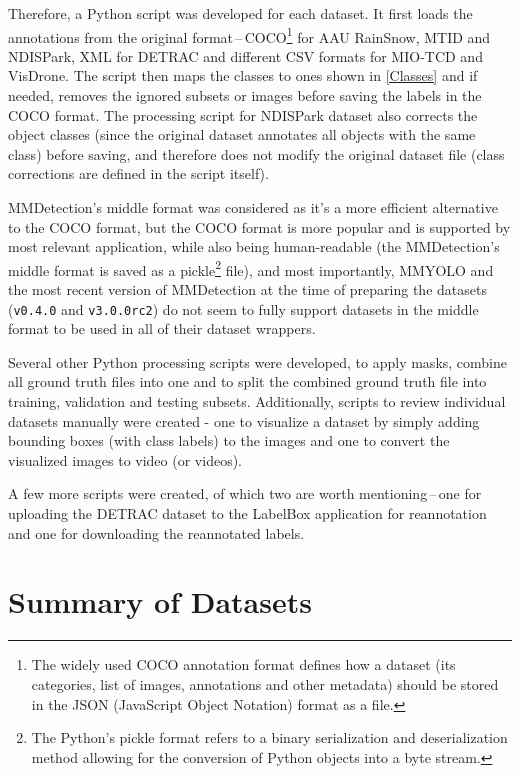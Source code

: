 Therefore, a Python script was developed for each dataset. It first loads the
annotations from the original format\,--\,COCO\footnote{The widely used COCO
annotation format defines how a dataset (its categories, list of images,
annotations and other metadata) should be stored in the JSON (JavaScript Object
Notation) format as a file.} for AAU RainSnow, MTID
and NDISPark, XML for DETRAC and different CSV formats for MIO-TCD and VisDrone.
The script then maps the classes to ones shown in \autoref{Classes} and if
needed, removes the ignored subsets or images before saving the labels in the
COCO format. The processing script for NDISPark dataset also corrects the object
classes (since the original dataset annotates all objects with the same class)
before saving, and therefore does not modify the original dataset file (class
corrections are defined in the script itself).

MMDetection's middle format was considered as it's a more efficient alternative
to the COCO format, but the COCO format is more popular and is supported by most
relevant application, while also being human-readable (the MMDetection's middle
format is saved as a pickle\footnote{The Python's pickle format refers to a
binary serialization and deserialization method allowing for the conversion of
Python objects into a byte stream.} file), and most importantly, MMYOLO and the
most recent version of MMDetection at the time of preparing the datasets
(\texttt{v0.4.0} and \texttt{v3.0.0rc2}) do not seem to fully support datasets
in the middle format to be used in all of their dataset wrappers.

Several other Python processing scripts were developed, to apply masks, combine
all ground truth files into one and to split the combined ground truth file into
training, validation and testing subsets. Additionally, scripts to review
individual datasets manually were created - one to visualize a dataset by simply
adding bounding boxes (with class labels) to the images and one to convert the
visualized images to video (or videos).

A few more scripts were created, of which two are worth mentioning\,--\,one for
uploading the DETRAC dataset to the LabelBox application for reannotation and
one for downloading the reannotated labels.


\section{Summary of Datasets}

